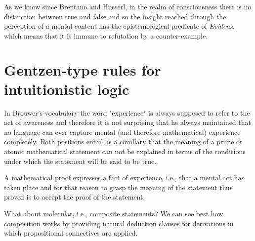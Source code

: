 \documentclass[12pt]{article}
\begin{document}
As we know since Brentano and Husserl, in the realm of consciousness there is no distinction between true and false and so the insight reached through the perception of a mental content has the epistemological predicate of \emph{Evidenz}, which means that it is immune to refutation by a counter-example.

\section{Gentzen-type rules for intuitionistic logic}\normalsize

In Brouwer's vocabulary the word "experience" is always supposed to refer to the act of awareness and therefore it is not surprising that he always maintained that no language can ever capture mental (and therefore mathematical) experience completely. Both positions entail as a corollary that the meaning of a prime or atomic mathematical  statement can not be explained in terms of the conditions under which the statement will be said to be true. 

A mathematical proof expresses a fact of experience, i.e., that a mental act has taken place and for that reason to grasp the meaning of the statement thus proved is to accept the proof of the statement.

What about molecular, i.e., composite statements? We can see best how composition works by providing natural deduction clauses for derivations in which propositional connectives are applied. 
\end{document}
